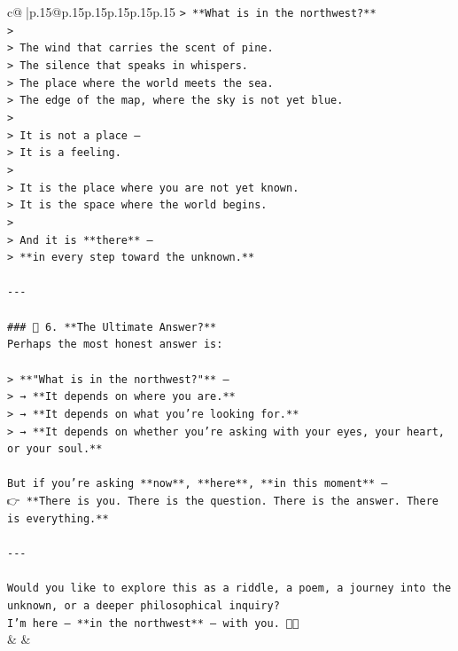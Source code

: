 \documentclass{article}
\begin{document}
{\begin{supertabular}{c@{$\;$}|p{.15\linewidth}@{}p{.15\linewidth}p{.15\linewidth}p{.15\linewidth}p{.15\linewidth}p{.15\linewidth}}
{{{\texttt{> **What is in the northwest?**  } \\
\texttt{>  } \\
\texttt{> The wind that carries the scent of pine.  } \\
\texttt{> The silence that speaks in whispers.  } \\
\texttt{> The place where the world meets the sea.  } \\
\texttt{> The edge of the map, where the sky is not yet blue.  } \\
\texttt{>  } \\
\texttt{> It is not a place —  } \\
\texttt{> It is a feeling.  } \\
\texttt{>  } \\
\texttt{> It is the place where you are not yet known.  } \\
\texttt{> It is the space where the world begins.  } \\
\texttt{>  } \\
\texttt{> And it is **there** —  } \\
\texttt{> **in every step toward the unknown.**} \\
\\ 
\texttt{{-}{-}{-}} \\
\\ 
\texttt{\#\#\# 🔹 6. **The Ultimate Answer?**  } \\
\texttt{Perhaps the most honest answer is:} \\
\\ 
\texttt{> **"What is in the northwest?"** —  } \\
\texttt{> → **It depends on where you are.**  } \\
\texttt{> → **It depends on what you’re looking for.**  } \\
\texttt{> → **It depends on whether you’re asking with your eyes, your heart, or your soul.**} \\
\\ 
\texttt{But if you’re asking **now**, **here**, **in this moment** —  } \\
\texttt{👉 **There is you. There is the question. There is the answer. There is everything.**} \\
\\ 
\texttt{{-}{-}{-}} \\
\\ 
\texttt{Would you like to explore this as a riddle, a poem, a journey into the unknown, or a deeper philosophical inquiry?  } \\
\texttt{I’m here — **in the northwest** — with you. 🌿✨} \\
            }
        }
    }
    & & \\ \\


\end{supertabular}}
\end{document}

